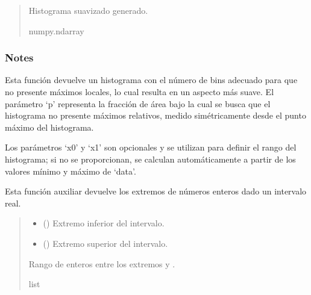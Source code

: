 \documentclass[letterpaper,10pt,english]{sphinxmanual}
\begin{document}
\begin{fulllineitems}
\begin{quote}
\begin{description}
\begin{itemize}
\end{itemize}

\sphinxAtStartPar
Histograma suavizado generado.

\sphinxAtStartPar
numpy.ndarray

\end{description}\end{quote}
\subsubsection*{Notes}

\sphinxAtStartPar
Esta función devuelve un histograma con el número de bins adecuado para que no presente máximos locales,
lo cual resulta en un aspecto más suave. El parámetro ‘p’ representa la fracción de área bajo la cual
se busca que el histograma no presente máximos relativos, medido simétricamente desde el punto máximo
del histograma.

\sphinxAtStartPar
Los parámetros ‘x0’ y ‘x1’ son opcionales y se utilizan para definir el rango del histograma; si no se
proporcionan, se calculan automáticamente a partir de los valores mínimo y máximo de ‘data’.

\end{fulllineitems}


\begin{fulllineitems}
\label{\detokenize{utils.stats:utils.stats.intervalo_int}}
\pysigstartsignatures
{}
\pysigstopsignatures
\sphinxAtStartPar
Esta función auxiliar devuelve los extremos de números enteros dado un intervalo real.
\begin{quote}\begin{description}
\begin{itemize}
\item {} 
\sphinxAtStartPar
{} () \textendash{} Extremo inferior del intervalo.

\item {} 
\sphinxAtStartPar
{} () \textendash{} Extremo superior del intervalo.

\end{itemize}

\sphinxAtStartPar
Rango de enteros entre los extremos  y .

\sphinxAtStartPar
list

\end{description}\end{quote}

\end{fulllineitems}
\end{document}
